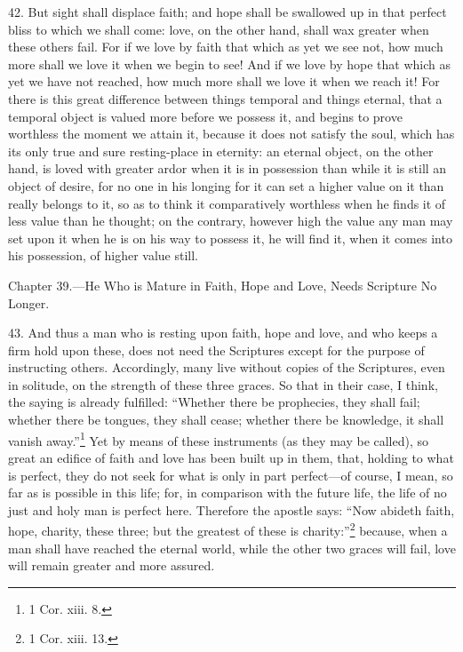 42. But sight shall displace faith; and hope shall be swallowed up in that perfect bliss to which we shall come: love, on the other hand, shall wax greater when these others fail. For if we love by faith that which as yet we see not, how much more shall we love it when we begin to see! And if we love by hope that which as yet we have not reached, how much  more shall we love it when we reach it! For there is this great difference between things temporal and things eternal, that a temporal object is valued more before we possess it, and begins to prove worthless the moment we attain it, because it does not satisfy the soul, which has its only true and sure resting-place in eternity: an eternal object, on the other hand, is loved with greater ardor when it is in possession than while it is still an object of desire, for no one in his longing for it can set a higher value on it than really belongs to it, so as to think it comparatively worthless when he finds it of less value than he thought; on the contrary, however high the value any man may set upon it when he is on his way to possess it, he will find it, when it comes into his possession, of higher value still.


Chapter 39.—He Who is Mature in Faith, Hope and Love, Needs Scripture No Longer.

43. And thus a man who is resting upon faith, hope and love, and who keeps a firm hold upon these, does not need the Scriptures except for the purpose of instructing others. Accordingly, many live without copies of the Scriptures, even in solitude, on the strength of these three graces. So that in their case, I think, the saying is already fulfilled: “Whether there be prophecies, they shall fail; whether there be tongues, they shall cease; whether there be knowledge, it shall vanish away.”\footnote{1 Cor. xiii. 8.} Yet by means of these instruments (as they may be called), so great an edifice of faith and love has been built up in them, that, holding to what is perfect, they do not seek for what is only in part perfect—of course, I mean, so far as is possible in this life; for, in comparison with the future life, the life of no just and holy man is perfect here. Therefore the apostle says: “Now abideth faith, hope, charity, these three; but the greatest of these is charity:”\footnote{1 Cor. xiii. 13.} because, when a man shall have reached the eternal world, while the other two graces will fail, love will remain greater and more assured.


